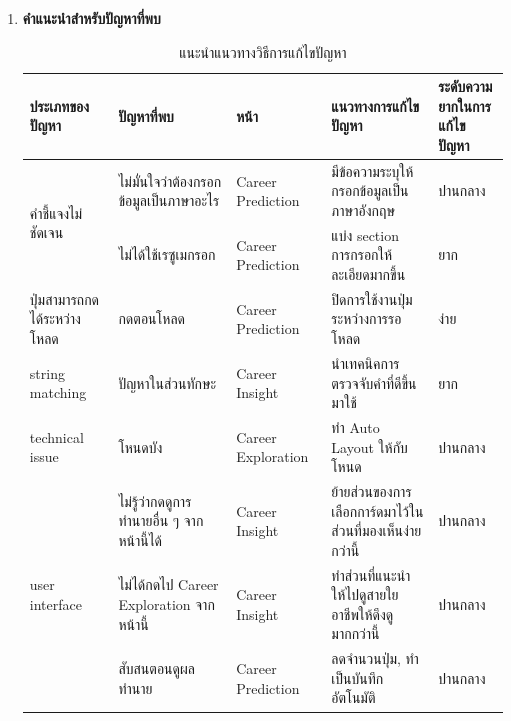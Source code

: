 \begin{enumerate}
    \item \textbf{คำแนะนำสำหรับปัญหาที่พบ}
          \begin{table}[H]
              \caption{แนะนำแนวทางวิธีการแก้ไขปัญหา}
              \label{tab:recommendationsUT}
              \begin{tabularx}{\textwidth}{|l|X|l|X|X|}
                  \hline
                  \textbf{ประเภทของปัญหา}                 & \textbf{ปัญหาที่พบ}                    & \textbf{หน้า}      & \textbf{แนวทางการแก้ไขปัญหา}                          & \textbf{ระดับความยากในการแก้ไขปัญหา} \\ \hline
                  \multirow[t]{2}{*}{คำชี้แจงไม่ชัดเจน} & ไม่มั่นใจว่าต้องกรอกข้อมูลเป็นภาษาอะไร     & Career Prediction  & มีข้อความระบุให้กรอกข้อมูลเป็นภาษาอังกฤษ                  & ปานกลาง                  \\ \cline{2-5}
                                                      & ไม่ได้ใช้เรซูเมกรอก                 & Career Prediction  & แบ่ง section การกรอกให้ละเอียดมากขึ้น                  & ยาก               \\ \hline
                  ปุ่มสามารถกดได้ระหว่างโหลด                  & กดตอนโหลด                         & Career Prediction  & ปิดการใช้งานปุ่มระหว่างการรอโหลด                       & ง่าย                    \\ \hline
                  string matching                     & ปัญหาในส่วนทักษะ                  & Career Insight     & นำเทคนิคการตรวจจับคำที่ดีขึ้นมาใช้                          & ยาก               \\ \hline
                  technical issue                     & โหนดบัง                            & Career Exploration & ทำ Auto Layout ให้กับโหนด                           & ปานกลาง                  \\ \hline
                  \multirow[t]{3}{*}{user interface}  & ไม่รู้ว่ากดดูการทำนายอื่น ๆ จากหน้านี้ได้ & Career Insight     & ย้ายส่วนของการเลือกการ์ดมาไว้ในส่วนที่มองเห็นง่ายกว่านี้ & ปานกลาง                  \\ \cline{2-5}
                                                      & ไม่ได้กดไป Career Exploration จากหน้านี้                & Career Insight     & ทำส่วนที่แนะนำให้ไปดูสายใยอาชีพให้ดึงดูมากกว่านี้          & ปานกลาง                  \\ \cline{2-5}
                                                      & สับสนตอนดูผลทำนาย                     & Career Prediction  & ลดจำนวนปุ่ม, ทำเป็นบันทึกอัตโนมัติ                        & ปานกลาง                  \\ \hline

\end{tabularx}
\end{table}
\end{enumerate}
